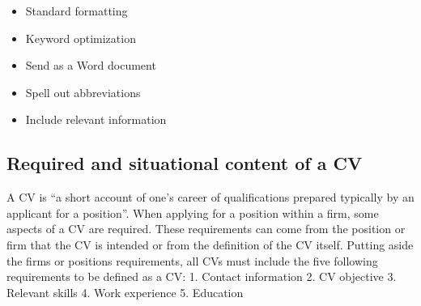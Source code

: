 \begin{itemize}
\item Standard formatting
\item Keyword optimization
\item Send as a Word document
\item Spell out abbreviations
\item Include relevant information\cite{ATS}
\end{itemize}
 

\subsection{Required and situational content of a CV}
A CV is “a short account of one’s career of qualifications prepared typically by an applicant for a position”.\cite{Difference_between_resume_and_curriculum_Vitae}
When applying for a position within a firm, some aspects of a CV are required.
These requirements can come from the position or firm that the CV is intended or from the definition of the CV itself.
Putting aside the firms or positions requirements, all CVs must include the five following requirements to be defined as a CV:
1. Contact information
2. CV objective
3. Relevant skills
4. Work experience
5. Education\cite{Write_a_curriculum_Vitae}

